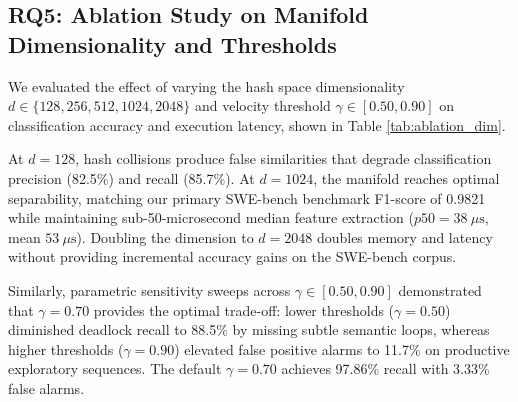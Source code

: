 \documentclass[journal]{IEEEtran}
\begin{document}
\subsection{RQ5: Ablation Study on Manifold Dimensionality and Thresholds}
\label{sec:ablation}

We evaluated the effect of varying the hash space dimensionality $d \in \{128, 256, 512, 1024, 2048\}$ and velocity threshold $\gamma \in [0.50, 0.90]$ on classification accuracy and execution latency, shown in Table \ref{tab:ablation_dim}.

\begin{table}[!t]
\caption{Ablation of Manifold Dimension $d$ on SWE-bench Corpus}
\label{tab:ablation_dim}
\centering
{}
\end{table}

At $d = 128$, hash collisions produce false similarities that degrade classification precision (82.5\%) and recall (85.7\%). At $d = 1024$, the manifold reaches optimal separability, matching our primary SWE-bench benchmark F1-score of 0.9821 while maintaining sub-50-microsecond median feature extraction ($p50 = 38\ \mu\text{s}$, mean $53\ \mu\text{s}$). Doubling the dimension to $d = 2048$ doubles memory and latency without providing incremental accuracy gains on the SWE-bench corpus.

Similarly, parametric sensitivity sweeps across $\gamma \in [0.50, 0.90]$ demonstrated that $\gamma = 0.70$ provides the optimal trade-off: lower thresholds ($\gamma = 0.50$) diminished deadlock recall to 88.5\% by missing subtle semantic loops, whereas higher thresholds ($\gamma = 0.90$) elevated false positive alarms to 11.7\% on productive exploratory sequences. The default $\gamma = 0.70$ achieves 97.86\% recall with 3.33\% false alarms.
\end{document}
